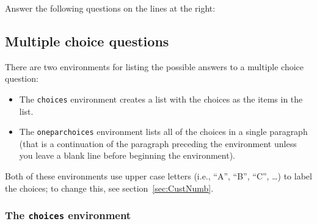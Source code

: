 \documentclass[12pt]{exam}
\begin{document}
\begin{questions}
\question
Answer the following questions on the lines at the right:  
\end{questions}


\subsection{Multiple choice questions}
\label{sec:MulChc}

There are two environments for listing the possible answers to a
multiple choice question:
\begin{itemize}
\item The \verb"choices" environment creates a list with the choices
  as the items in the list.
\item The \verb"oneparchoices" environment lists all of the choices in
  a single paragraph (that is a continuation of the paragraph
  preceding the environment unless you leave a blank line before
  beginning the environment).
\end{itemize}
Both of these environments use upper case letters (i.e., ``A'', ``B'',
``C'', \ldots) to label the choices; to change this, see
section~\ref{sec:CustNumb}.

\subsubsection{The \texttt{choices} environment}
\label{sec:choices}
\end{document}
